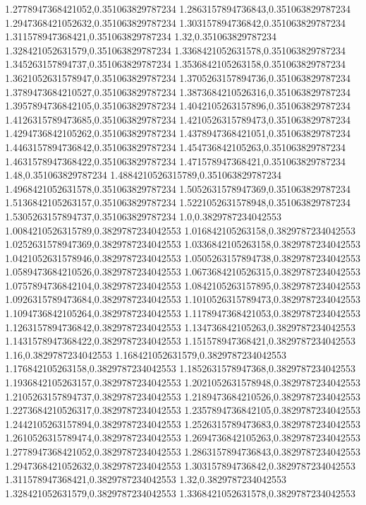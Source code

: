 1.2778947368421052,0.351063829787234
1.2863157894736843,0.351063829787234
1.2947368421052632,0.351063829787234
1.303157894736842,0.351063829787234
1.311578947368421,0.351063829787234
1.32,0.351063829787234
1.328421052631579,0.351063829787234
1.3368421052631578,0.351063829787234
1.345263157894737,0.351063829787234
1.3536842105263158,0.351063829787234
1.3621052631578947,0.351063829787234
1.3705263157894736,0.351063829787234
1.3789473684210527,0.351063829787234
1.3873684210526316,0.351063829787234
1.3957894736842105,0.351063829787234
1.4042105263157896,0.351063829787234
1.4126315789473685,0.351063829787234
1.4210526315789473,0.351063829787234
1.4294736842105262,0.351063829787234
1.4378947368421051,0.351063829787234
1.4463157894736842,0.351063829787234
1.454736842105263,0.351063829787234
1.4631578947368422,0.351063829787234
1.471578947368421,0.351063829787234
1.48,0.351063829787234
1.4884210526315789,0.351063829787234
1.4968421052631578,0.351063829787234
1.5052631578947369,0.351063829787234
1.5136842105263157,0.351063829787234
1.5221052631578948,0.351063829787234
1.5305263157894737,0.351063829787234
1.0,0.3829787234042553
1.0084210526315789,0.3829787234042553
1.016842105263158,0.3829787234042553
1.0252631578947369,0.3829787234042553
1.0336842105263158,0.3829787234042553
1.0421052631578946,0.3829787234042553
1.0505263157894738,0.3829787234042553
1.0589473684210526,0.3829787234042553
1.0673684210526315,0.3829787234042553
1.0757894736842104,0.3829787234042553
1.0842105263157895,0.3829787234042553
1.0926315789473684,0.3829787234042553
1.1010526315789473,0.3829787234042553
1.1094736842105264,0.3829787234042553
1.1178947368421053,0.3829787234042553
1.1263157894736842,0.3829787234042553
1.134736842105263,0.3829787234042553
1.1431578947368422,0.3829787234042553
1.151578947368421,0.3829787234042553
1.16,0.3829787234042553
1.168421052631579,0.3829787234042553
1.176842105263158,0.3829787234042553
1.1852631578947368,0.3829787234042553
1.1936842105263157,0.3829787234042553
1.2021052631578948,0.3829787234042553
1.2105263157894737,0.3829787234042553
1.2189473684210526,0.3829787234042553
1.2273684210526317,0.3829787234042553
1.2357894736842105,0.3829787234042553
1.2442105263157894,0.3829787234042553
1.2526315789473683,0.3829787234042553
1.2610526315789474,0.3829787234042553
1.2694736842105263,0.3829787234042553
1.2778947368421052,0.3829787234042553
1.2863157894736843,0.3829787234042553
1.2947368421052632,0.3829787234042553
1.303157894736842,0.3829787234042553
1.311578947368421,0.3829787234042553
1.32,0.3829787234042553
1.328421052631579,0.3829787234042553
1.3368421052631578,0.3829787234042553
